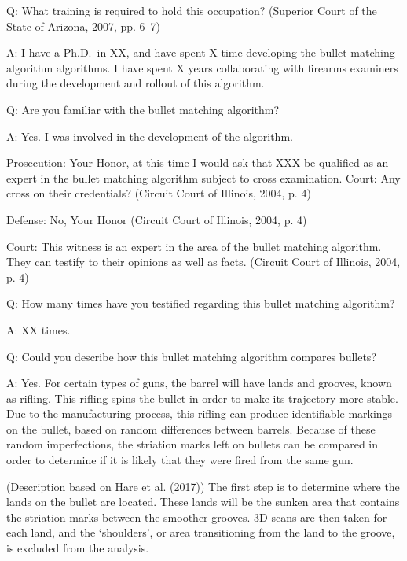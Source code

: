 \documentclass[print]{nuthesis}
\begin{document}
Q: What training is required to hold this occupation? (Superior Court of the State of Arizona, 2007, pp. 6--7)

A: I have a Ph.D.~in XX, and have spent X time developing the bullet matching algorithm algorithms.
I have spent X years collaborating with firearms examiners during the development and rollout of this algorithm.

Q: Are you familiar with the bullet matching algorithm?

A: Yes. I was involved in the development of the algorithm.

Prosecution: Your Honor, at this time I would ask that XXX be qualified as an expert in the bullet matching algorithm subject to cross examination.
Court: Any cross on their credentials? (Circuit Court of Illinois, 2004, p. 4)

Defense: No, Your Honor (Circuit Court of Illinois, 2004, p. 4)

Court: This witness is an expert in the area of the bullet matching algorithm. They can testify to their opinions as well as facts. (Circuit Court of Illinois, 2004, p. 4)

Q: How many times have you testified regarding this bullet matching algorithm?

A: XX times.

Q: Could you describe how this bullet matching algorithm compares bullets?

A: Yes. For certain types of guns, the barrel will have lands and grooves, known as rifling.
This rifling spins the bullet in order to make its trajectory more stable. Due to the manufacturing process, this rifling can produce identifiable markings on the bullet, based on random differences between barrels.
Because of these random imperfections, the striation marks left on bullets can be compared in order to determine if it is likely that they were fired from the same gun.

(Description based on Hare et al. (2017))
The first step is to determine where the lands on the bullet are located.
These lands will be the sunken area that contains the striation marks between the smoother grooves.
3D scans are then taken for each land, and the `shoulders', or area transitioning from the land to the groove, is excluded from the analysis.
\end{document}
